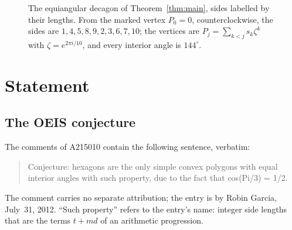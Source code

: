\documentclass[11pt]{amsart}
\theoremstyle{plain}
\theoremstyle{definition}
\begin{document}
\begin{figure}[t]
\begin{minipage}[c]{0.3\textwidth}
\centering
{}
\end{minipage}\hfill
\begin{minipage}[c]{0.66\textwidth}
\caption{The equiangular decagon of Theorem~\ref{thm:main}, sides labelled by their lengths. From the marked vertex $P_0=0$, counterclockwise, the sides are $1,4,5,8,9,2,3,6,7,10$; the vertices are $P_j=\sum_{k<j}s_k\zeta^k$ with $\zeta=e^{2\pi i/10}$, and every interior angle is $144^\circ$.}
\label{fig:decagon}
\end{minipage}
\end{figure}

\section{Statement}\label{sec:statement}

\subsection*{The OEIS conjecture}
The comments of A215010 contain the following sentence, verbatim:
\begin{quote}
Conjecture: hexagons are the only simple convex polygons with equal interior angles with such property, due to the fact that cos(Pi/3) = 1/2.
\end{quote}
The comment carries no separate attribution; the entry is by Robin Garcia, July~31, 2012.
``Such property'' refers to the entry's name: integer side lengths that are the terms $t+md$ of an arithmetic progression.
\end{document}
